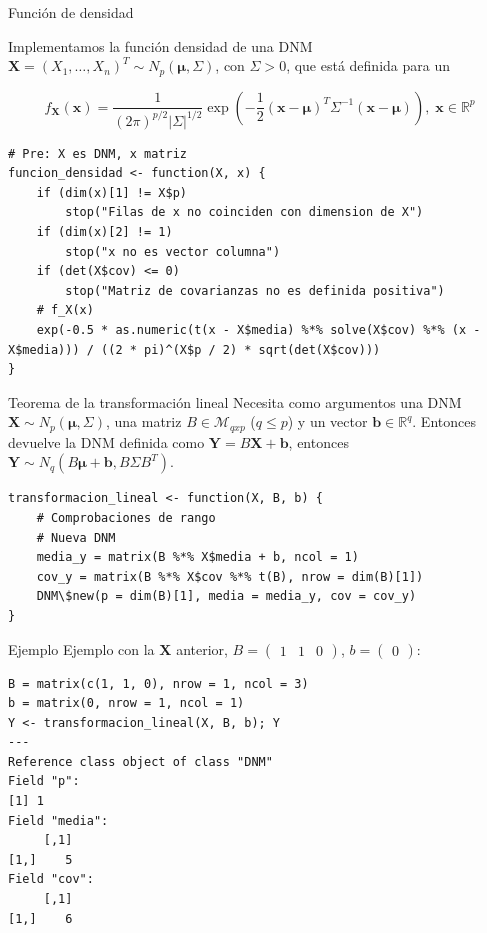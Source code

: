 \documentclass[xcolor=table]{beamer}
\begin{document}
\begin{frame}[fragile]{Función de densidad}

Implementamos la función densidad de una DNM $\pmb{X} = (X_1, \ldots, X_n)^T \sim N_p(\pmb{\mu}, \Sigma)$, con $\Sigma > 0$, que está definida para un 

$$f_{\pmb{X}}(\pmb{x}) = \dfrac{1}{(2\pi)^{p/2}|\Sigma|^{1/2}} \exp\left(-\frac{1}{2}(\pmb{x} - \pmb{\mu})^T\Sigma^{-1}(\pmb{x} - \pmb{\mu})\right), \; \pmb{x} \in \mathbb{R}^p $$

\scriptsize
  \begin{lstlisting}
# Pre: X es DNM, x matriz
funcion_densidad <- function(X, x) {
    if (dim(x)[1] != X$p)
        stop("Filas de x no coinciden con dimension de X")
    if (dim(x)[2] != 1)
        stop("x no es vector columna")
    if (det(X$cov) <= 0)
        stop("Matriz de covarianzas no es definida positiva")
    # f_X(x)
    exp(-0.5 * as.numeric(t(x - X$media) %*% solve(X$cov) %*% (x - X$media))) / ((2 * pi)^(X$p / 2) * sqrt(det(X$cov)))
}
  \end{lstlisting}
\end{frame}

\begin{frame}[fragile]{Teorema de la transformación lineal}
Necesita como argumentos una DNM $\pmb{X} \sim N_p(\pmb{\mu}, \Sigma)$, una matriz $B \in \mathcal{M}_{qxp}$ ($q \leq p$) y un vector $\pmb{b} \in \mathbb{R}^q$. Entonces devuelve la DNM definida como $\pmb{Y} = B \pmb{X} + \pmb{b}$, entonces $\pmb{Y} \sim N_q(B \pmb{\mu} + \pmb{b}, B \Sigma B^T)$.

\begin{lstlisting}
transformacion_lineal <- function(X, B, b) {
    # Comprobaciones de rango
    # Nueva DNM
    media_y = matrix(B %*% X$media + b, ncol = 1)
    cov_y = matrix(B %*% X$cov %*% t(B), nrow = dim(B)[1])
    DNM\$new(p = dim(B)[1], media = media_y, cov = cov_y)
}
\end{lstlisting}
\end{frame}
\begin{frame}[fragile]{Ejemplo}
Ejemplo con la $\pmb{X}$ anterior, $B = \begin{pmatrix} 1 & 1 & 0 \end{pmatrix}$, $b = \begin{pmatrix} 0 \end{pmatrix}$:
\begin{lstlisting}
B = matrix(c(1, 1, 0), nrow = 1, ncol = 3)
b = matrix(0, nrow = 1, ncol = 1)
Y <- transformacion_lineal(X, B, b); Y
---
Reference class object of class "DNM"
Field "p":
[1] 1
Field "media":
     [,1]
[1,]    5
Field "cov":
     [,1]
[1,]    6
\end{lstlisting}
\end{frame}
\end{document}
